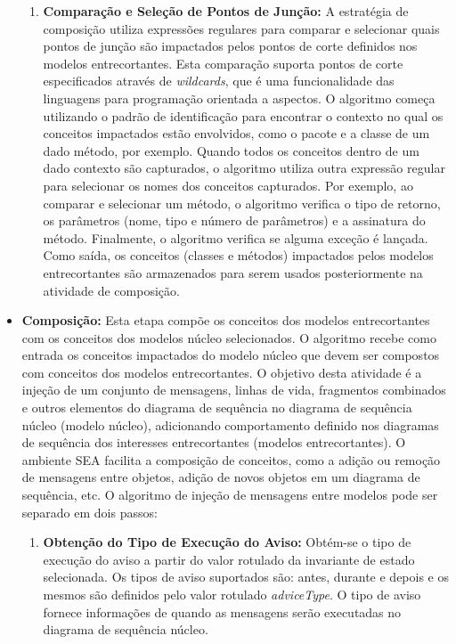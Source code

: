 \begin{itemize}
\begin{enumerate}
	    \item \textbf{Comparação e Seleção de Pontos de Junção:} A estratégia de composição utiliza expressões regulares para comparar e selecionar
	    quais pontos de junção são impactados pelos pontos de corte definidos nos modelos entrecortantes. Esta comparação suporta pontos de corte
	    especificados através de \textit{wildcards}, que é uma funcionalidade das linguagens para programação orientada a aspectos. O
	    algoritmo começa utilizando o padrão de identificação para encontrar o contexto no qual os conceitos impactados estão envolvidos, como o pacote e
	    a classe de um dado método, por exemplo. Quando todos os conceitos dentro de um dado contexto são capturados, o algoritmo utiliza outra expressão
	    regular para selecionar os nomes dos conceitos capturados. Por exemplo, ao comparar e selecionar um método, o algoritmo verifica o tipo de
	    retorno, os parâmetros (nome, tipo e número de parâmetros) e a assinatura do método. Finalmente, o algoritmo verifica se alguma exceção é
	    lançada. Como saída, os conceitos (classes e métodos) impactados pelos modelos entrecortantes são armazenados para serem usados posteriormente na
	    atividade de composição.
	  \end{enumerate}  
	  
	  \item \textbf{Composição:} Esta etapa compõe os conceitos dos modelos entrecortantes com os conceitos dos modelos núcleo selecionados. O algoritmo
	  recebe como entrada os conceitos impactados do modelo núcleo que devem ser compostos com conceitos dos modelos entrecortantes. O objetivo desta
	  atividade é a injeção de um conjunto de mensagens, linhas de vida, fragmentos combinados e outros elementos do diagrama de sequência no diagrama de
	  sequência núcleo (modelo núcleo), adicionando comportamento definido nos diagramas de sequência dos interesses entrecortantes (modelos
	  entrecortantes). O ambiente SEA facilita a composição de conceitos, como a adição ou remoção de mensagens entre objetos, adição de novos objetos em
	  um diagrama de sequência, etc. O algoritmo de injeção de mensagens entre modelos pode ser separado em dois passos:
	  
		  \begin{enumerate}
		    
		    \item \textbf{Obtenção do Tipo de Execução do Aviso:} Obtém-se o tipo de execução do aviso a partir do valor rotulado da invariante de estado
		    selecionada. Os tipos de aviso suportados são: antes, durante e depois e os mesmos são definidos pelo valor rotulado \textit{adviceType}. O tipo
		    de aviso fornece informações de quando as mensagens serão executadas no diagrama de sequência núcleo.


\end{enumerate}
\end{itemize}
